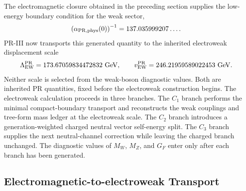 \documentclass[11pt]{article}
\begin{document}
The electromagnetic closure obtained in the preceding section supplies the low-energy boundary condition for the weak sector,
\begin{equation}
\left(\alpha_{\rm PR,phys}(0)\right)^{-1}
=
137.035999207\dots.
\end{equation}
PR-III now transports this generated quantity to the inherited electroweak displacement scale
\begin{equation}
\Lambda_{\rm EW}^{\rm PR}
=
173.67059834472832\ {\rm GeV},
\qquad
v_{\rm EW}^{\rm PR}
=
246.21959589022453\ {\rm GeV}.
\end{equation}
Neither scale is selected from the weak-boson diagnostic values.  Both are inherited PR quantities, fixed before the electroweak construction begins. The electroweak calculation proceeds in three branches.  The \(C_1\) branch performs the minimal compact-boundary transport and reconstructs the weak couplings and tree-form mass ledger at the electroweak scale.  The \(C_2\) branch introduces a generation-weighted charged neutral vector self-energy split.  The \(C_3\) branch supplies the next neutral-channel correction while leaving the charged branch unchanged.  The diagnostic values of \(M_W\), \(M_Z\), and \(G_F\) enter only after each branch has been generated.

\subsection{Electromagnetic-to-electroweak Transport}
\label{subsec:priii-ew-scale-transport}
\end{document}
